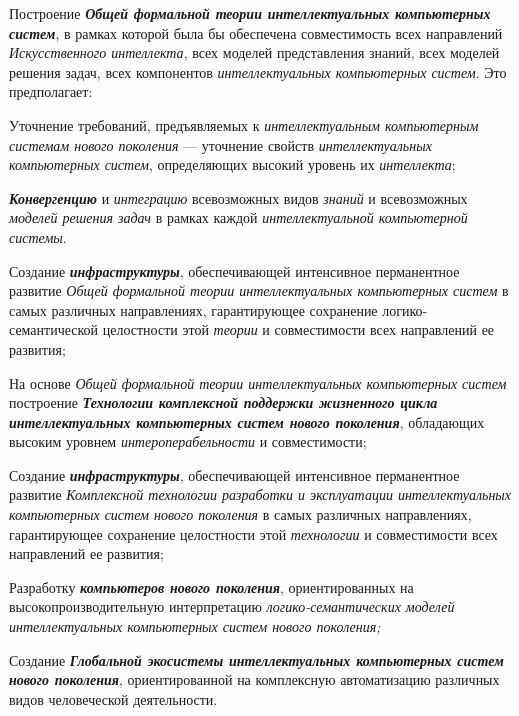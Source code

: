 \begin{textitemize}
	\item
	Построение \textbf{\textit{Общей формальной теории интеллектуальных компьютерных систем}}, в рамках которой была бы обеспечена совместимость всех направлений \textit{Искусственного интеллекта}, всех моделей представления знаний, всех моделей решения задач, всех компонентов \textit{интеллектуальных компьютерных систем}. Это предполагает:
	
	\begin{textitemize}
		\item
		Уточнение требований, предъявляемых к \textit{интеллектуальным компьютерным системам нового поколения} --- уточнение свойств \textit{интеллектуальных компьютерных систем}, определяющих высокий уровень их \textit{интеллекта};
		\item
		\textbf{\textit{Конвергенцию}} и \textit{интеграцию} всевозможных видов \textit{знаний} и всевозможных \textit{моделей решения задач} в рамках каждой \textit{интеллектуальной компьютерной системы}.
	\end{textitemize}
	
	\item
	Создание \textbf{\textit{инфраструктуры}}, обеспечивающей интенсивное перманентное развитие \textit{Общей формальной теории интеллектуальных компьютерных систем} в самых различных направлениях, гарантирующее сохранение логико-семантической целостности этой \textit{теории} и совместимости всех направлений ее развития;
	\item
	На основе \textit{Общей формальной теории интеллектуальных компьютерных систем} построение \textbf{\textit{Технологии комплексной поддержки жизненного цикла интеллектуальных компьютерных систем нового поколения}}, обладающих высоким уровнем \textit{интероперабельности} и совместимости;
	\item
	Создание \textbf{\textit{инфраструктуры}}, обеспечивающей интенсивное перманентное развитие \textit{Комплексной технологии разработки и эксплуатации интеллектуальных компьютерных систем нового поколения} в самых различных направлениях, гарантирующее сохранение целостности этой \textit{технологии} и совместимости всех направлений ее развития;
	\item
	Разработку \textbf{\textit{компьютеров нового поколения}}, ориентированных на высокопроизводительную интерпретацию \textit{логико-семантических моделей интеллектуальных компьютерных систем нового поколения;}
	\item
	Создание \textbf{\textit{Глобальной экосистемы интеллектуальных компьютерных систем нового поколения}}, ориентированной на комплексную автоматизацию различных видов человеческой деятельности.
\end{textitemize}

